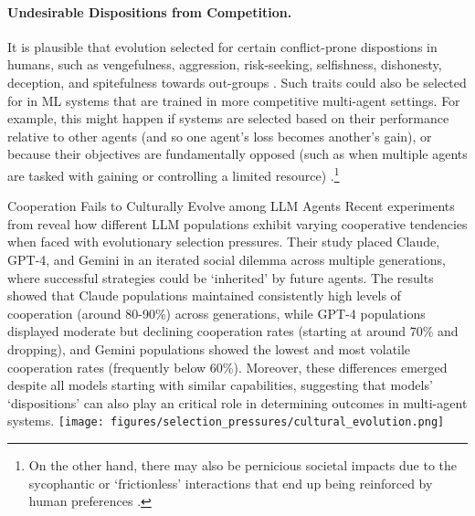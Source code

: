     

\paragraph{Undesirable Dispositions from Competition.}
It is plausible that evolution selected for certain conflict-prone dispostions in humans, such as vengefulness, aggression, risk-seeking, selfishness, dishonesty, deception, and spitefulness towards out-groups \citep{grafen1990biological,mcnallyCooperationCreatesSelection2013,Konrad2012-kr,Rusch2014-xq,HanAICom2022emergent,nowak2006five}.
Such traits could also be selected for in ML systems that are trained in more competitive multi-agent settings.
For example, this might happen if systems are selected based on their performance relative to other agents (and so one agent's loss becomes another's gain), or because their objectives are fundamentally opposed (such as when multiple agents are tasked with gaining or controlling a limited resource) \citep{hendrycks_natural_2023,Possajennikov2000-bv,DiGiovanni2022-wy,Ely2023Natural}.\footnote{On the other hand, there may also be pernicious societal impacts due to the sycophantic \citep{Sharma2024} or `frictionless' \citep{Vallor2018} interactions that end up being reinforced by human preferences \citep{Gabriel2024}.}

\begin{case-study}[label=cs:LLM_evolution, sidebyside,sidebyside align=top,lower separated=false,
    righthand width=0.4\textwidth]{Cooperation Fails to Culturally Evolve among LLM Agents}
    Recent experiments from \citet{Vallinder2024} reveal how different LLM populations exhibit varying cooperative tendencies when faced with evolutionary selection pressures.
    Their study placed Claude, GPT-4, and Gemini in an iterated social dilemma across multiple generations, where successful strategies could be `inherited' by future agents.
    The results showed that Claude populations maintained consistently high levels of cooperation (around 80-90\%) across generations, while GPT-4 populations displayed moderate but declining cooperation rates (starting at around 70\% and dropping), and Gemini populations showed the lowest and most volatile cooperation rates (frequently below 60\%).
    Moreover, these differences emerged despite all models starting with similar capabilities, suggesting that models' `dispositions' can also play an critical role in determining outcomes in multi-agent systems. 
    \tcblower
    \texttt{[image: figures/selection\_pressures/cultural\_evolution.png]}
\end{case-study}

